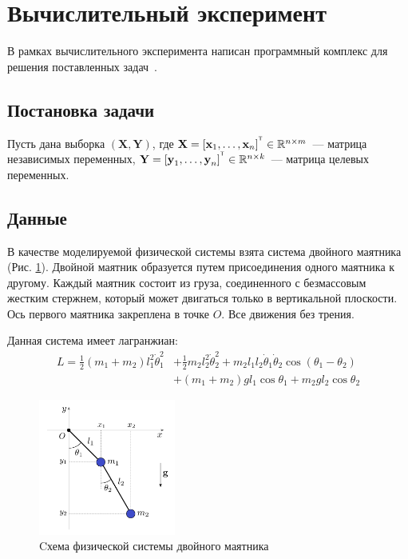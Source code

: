 \documentclass[12pt]{article}
\newcommand{\bY}{\mathbf{Y}}
\newcommand{\bX}{\mathbf{X}}
\newcommand{\T}{^{\text{\tiny\sffamily\upshape\mdseries T}}}
\begin{document}
	
	
	\section{Вычислительный эксперимент}
	В рамках вычислительного эксперимента написан программный комплекс для решения поставленных задач~\cite{source_code}.
	
	\subsection{Постановка задачи}
	
	Пусть дана выборка $(\bX, \bY)$, где $\textbf{X} = [\textbf{x}_1, \dots, \textbf{x}_{n}]^{\T} \in \mathbb{R}^{n \times m}$~--- матрица независимых переменных, $\textbf{Y} = [\textbf{y}_1, \dots, \textbf{y}_n]^{\T} \in \mathbb{R}^{n \times k}$~--- матрица целевых переменных.
	
	\subsection{Данные}
	
	В качестве моделируемой физической системы взята система двойного маятника (Рис. \ref{fig:pendulum_system}). Двойной маятник образуется путем присоединения одного маятника к другому. Каждый маятник состоит из груза, соединенного с безмассовым жестким стержнем, который может двигаться только в вертикальной плоскости. Ось первого маятника закреплена в точке $O$. Все движения без трения.
	
	Данная система имеет лагранжиан:
	$$
	\begin{aligned}
	L=\frac{1}{2}\left(m_{1}+m_{2}\right) l_{1}^{2} \dot{\theta}_{1}^{2} &+\frac{1}{2} m_{2} l_{2}^{2} \dot{\theta}_{2}^{2}+m_{2} l_{1} l_{2} \dot{\theta}_{1} \dot{\theta}_{2} \cos \left(\theta_{1}-\theta_{2}\right) \\
	&+\left(m_{1}+m_{2}\right) g l_{1} \cos \theta_{1}+m_{2} g l_{2} \cos \theta_{2}
	\end{aligned}
	$$
	
	\begin{figure}[H]
		\centering
		\includegraphics[width=0.4\textwidth]{double_pendulum_scheme.png}
		\caption{Cхема физической системы двойного маятника}
		\label{fig:pendulum_system}
	\end{figure}
\end{document}
